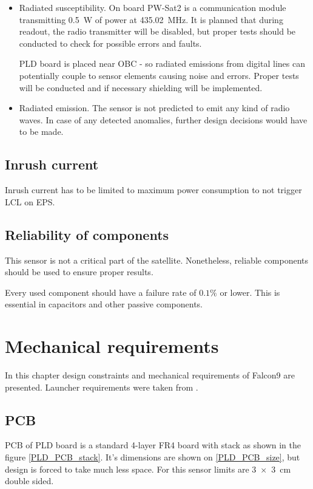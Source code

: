 \begin{itemize}
            \item Radiated susceptibility.
                On board PW-Sat2 is a communication module transmitting \SI{0.5}{\watt} of power at \SI{435.02}{\mega\hertz}. It is planned that during readout, the radio transmitter will be disabled, but proper tests should be conducted to check for possible errors and faults.

                PLD board is placed near OBC - so radiated emissions from digital lines can potentially couple to sensor elements causing noise and errors. Proper tests will be conducted and if necessary shielding will be implemented.

            \item Radiated emission.
                The sensor is not predicted to emit any kind of radio waves. In case of any detected anomalies, further design decisions would have to be made.

        \end{itemize}


    \subsection{Inrush current}
        Inrush current has to be limited to maximum power consumption to not trigger LCL on EPS.

    \subsection{Reliability of components}
        This sensor is not a critical part of the satellite. Nonetheless, reliable components should be used to ensure proper results.

        Every used component should have a failure rate of $0.1\si{\percent}$ or lower. This is essential in capacitors and other passive components.


\section{Mechanical requirements}
    In this chapter design constraints and mechanical requirements of Falcon9 are presented. Launcher requirements were taken from \cite{Falcon9_user_manual}.

    \subsection{PCB}
    \label{PCB_description}
        PCB of PLD board is a standard 4-layer FR4 board with stack as shown in the figure \ref{PLD_PCB_stack}. It's dimensions are shown on \ref{PLD_PCB_size}, but design is forced to take much less space. For this sensor limits are \SI{3x3}{\centi\meter} double sided.

